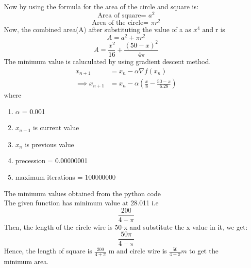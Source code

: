 \documentclass[journal,12pt,twocolumn]{IEEEtran}
\providecommand{\brak}[1]{\ensuremath{\left(#1\right)}}
\begin{document}
Now by using the formula for the area of the circle and square is:
\begin{equation}
\text{Area of square= }a^2
\end{equation}
\begin{equation}
\text{Area of the circle= }\pi r^2
\end{equation}
Now, the combined area(A) after substituting the value of a as $x^4$ and r is
\begin{equation}
A=a^2+\pi r^2
\end{equation}
\begin{equation}
A = \frac{x^2}{16} + \frac{(50-x)^2}{4\pi}
\end{equation}
The minimum value is caluculated by using gradient descent method.
\begin{align}
        x_{n+1} &= x_n - \alpha \nabla f(x_n) \\
        \implies x_{n+1} &= x_n - \alpha\brak{\frac{x}{8}-\frac{50-x}{6.28}}
\end{align}
where \\
\begin{enumerate}
\item $\alpha$ = 0.001
\item $x_{n+1}$ is current value
\item $x_{n}$ is previous value
\item precession = 0.00000001
\item maximum iterations = 100000000
\end{enumerate}
The minimum values obtained from the python code \vspace{5mm}\\
The given function has minimum value at 28.011 i.e
\begin{equation}
\frac{200}{4+\pi}
\end{equation}
Then, the length of the circle wire is 50-x and substitute the x value in it, we get:
\begin{equation}
\frac{50\pi}{4+\pi}
\end{equation}
Hence, the length of square is $\frac{200}{4+\pi}$ m and circle wire is $\frac{50}{4+\pi}m$ to get the minimum area.
\end{document}

